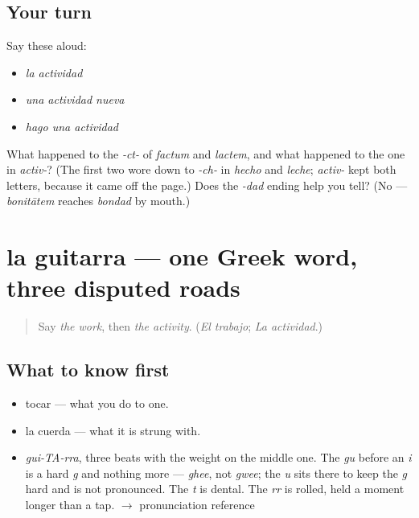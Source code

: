 \subsection*{Your turn}
Say these aloud:

\begin{itemize}
\raggedright
  \item \emph{la actividad}
  \item \emph{una actividad nueva}
  \item \emph{hago una actividad}
\end{itemize}

\begin{tcolorbox}[breakable,colback=teal!4,colframe=teal!35!black,title={Before you move on}]
What happened to the \emph{-ct-} of \emph{factum} and \emph{lactem}, and what happened to the one in \emph{activ-}? (The first two wore down to \emph{-ch-} in \emph{hecho} and \emph{leche}; \emph{activ-} kept both letters, because it came off the page.) Does the \emph{-dad} ending help you tell? (No — \emph{bonitātem} reaches \emph{bondad} by mouth.)
\end{tcolorbox}
\section[la guitarra]{la guitarra — one Greek word, three disputed roads}

\label{lesson:ES-C394-guitarra}



\begin{quote}
Say \emph{the work}, then \emph{the activity}. (\emph{El trabajo}; \emph{La actividad}.)
\end{quote}

\subsection*{What to know first}
\begin{itemize}
\raggedright
  \item tocar — what you do to one.
  \item la cuerda — what it is strung with.
\end{itemize}

\begin{sounds}
\begin{itemize}
\raggedright
  \item \emph{gui-TA-rra}, three beats with the weight on the middle one. The \emph{gu} before an \emph{i} is a hard \emph{g} and nothing more — \emph{ghee}, not \emph{gwee}; the \emph{u} sits there to keep the \emph{g} hard and is not pronounced. The \emph{t} is dental. The \emph{rr} is rolled, held a moment longer than a tap. $\to$ pronunciation reference
\end{itemize}
\end{sounds}

